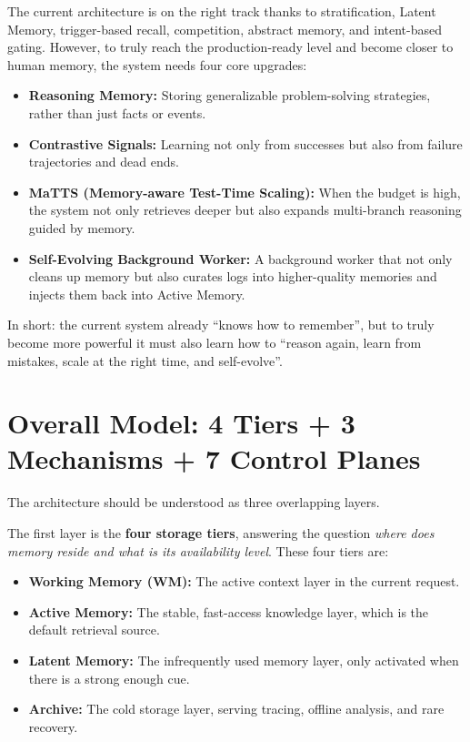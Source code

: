 \documentclass[a4paper,12pt]{article}
\begin{document}
The current architecture is on the right track thanks to stratification, Latent Memory, trigger-based recall, competition, abstract memory, and intent-based gating. However, to truly reach the production-ready level and become closer to human memory, the system needs four core upgrades:
\begin{itemize}
    \item \textbf{Reasoning Memory:} Storing generalizable problem-solving strategies, rather than just facts or events.
    \item \textbf{Contrastive Signals:} Learning not only from successes but also from failure trajectories and dead ends.
    \item \textbf{MaTTS (Memory-aware Test-Time Scaling):} When the budget is high, the system not only retrieves deeper but also expands multi-branch reasoning guided by memory.
    \item \textbf{Self-Evolving Background Worker:} A background worker that not only cleans up memory but also curates logs into higher-quality memories and injects them back into Active Memory.
\end{itemize}

In short: the current system already ``knows how to remember'', but to truly become more powerful it must also learn how to ``reason again, learn from mistakes, scale at the right time, and self-evolve''.

\section{Overall Model: 4 Tiers + 3 Mechanisms + 7 Control Planes}

The architecture should be understood as three overlapping layers.

The first layer is the \textbf{four storage tiers}, answering the question \emph{where does memory reside and what is its availability level}. These four tiers are:
\begin{itemize}
    \item \textbf{Working Memory (WM):} The active context layer in the current request.
    \item \textbf{Active Memory:} The stable, fast-access knowledge layer, which is the default retrieval source.
    \item \textbf{Latent Memory:} The infrequently used memory layer, only activated when there is a strong enough cue.
    \item \textbf{Archive:} The cold storage layer, serving tracing, offline analysis, and rare recovery.
\end{itemize}
\end{document}
